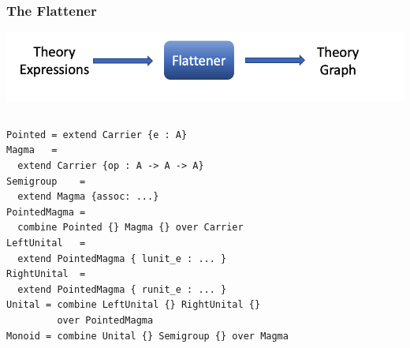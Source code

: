 \documentclass[t,10pt,numbers,fleqn,usenames,xcolor=dvipsnames]{beamer}
\begin{document}
\begin{frame}[fragile]
\frametitle{The Flattener} 
\begin{center}
\includegraphics[scale=0.2]{figures/flattener.png}
\end{center}

\begin{overprint}
\begin{columns}
\begin{column}{0.45\textwidth}
\begin{verbatim}
Pointed = extend Carrier {e : A}
Magma   = 
  extend Carrier {op : A -> A -> A}
Semigroup    = 
  extend Magma {assoc: ...}
PointedMagma = 
  combine Pointed {} Magma {} over Carrier
LeftUnital   = 
  extend PointedMagma { lunit_e : ... }
RightUnital  = 
  extend PointedMagma { runit_e : ... }
Unital = combine LeftUnital {} RightUnital {} 
         over PointedMagma
Monoid = combine Unital {} Semigroup {} over Magma
\end{verbatim}
\end{column}
\begin{column}{0.45\textwidth}



{\tiny
}
\end{column}
\end{columns}
\end{overprint}
\end{frame}

\begin{frame}[fragile] 

\end{frame}
\end{document}
